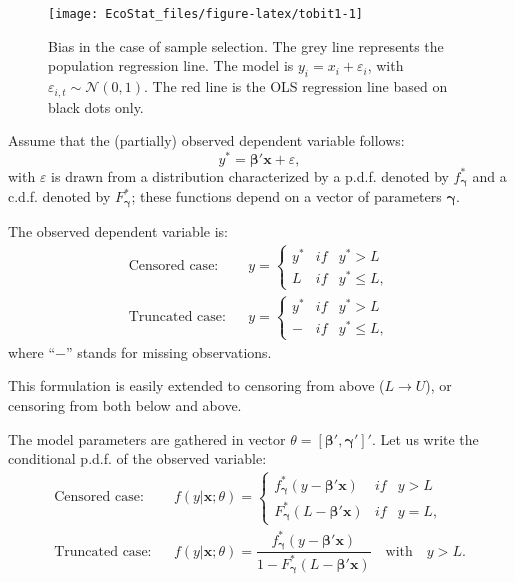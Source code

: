 \documentclass[
  12pt,
]{book}
\theoremstyle{definition}
\theoremstyle{definition}
\theoremstyle{definition}
\theoremstyle{definition}
\theoremstyle{remark}
\begin{document}
\begin{figure}
\texttt{[image: EcoStat\_files/figure-latex/tobit1-1]} \caption{Bias in the case of sample selection. The grey line represents the population regression line. The model is $y_i = x_i + \varepsilon_i$, with $\varepsilon_{i,t} \sim \mathcal{N}(0,1)$. The red line is the OLS regression line based on black dots only.}\label{fig:tobit1}
\end{figure}

Assume that the (partially) observed dependent variable follows:
\[
y^* = \boldsymbol\beta'\mathbf{x} + \varepsilon,
\]
with \(\varepsilon\) is drawn from a distribution characterized by a p.d.f. denoted by \(f_{\boldsymbol\gamma}^*\) and a c.d.f. denoted by \(F_{\boldsymbol\gamma}^*\); these functions depend on a vector of parameters \(\boldsymbol{\gamma}\).

The observed dependent variable is:
\begin{eqnarray*}
\mbox{Censored case:}&&y = \left\{
\begin{array}{ccc}
y^* &if& y^*>L \\
L &if& y^*\le L,
\end{array}
\right.\\
\mbox{Truncated case:}&&y = \left\{
\begin{array}{ccc}
y^* &if& y^*>L \\
- &if& y^*\le L,
\end{array}
\right.
\end{eqnarray*}
where ``\(-\)'' stands for missing observations.

This formulation is easily extended to censoring from above (\(L \rightarrow U\)), or censoring from both below and above.

The model parameters are gathered in vector \(\theta = [\boldsymbol\beta',\boldsymbol\gamma']'\). Let us write the conditional p.d.f. of the observed variable:
\begin{eqnarray*}
\mbox{Censored case:}&& f(y|\mathbf{x};\theta) = \left\{
\begin{array}{ccc}
f_{\boldsymbol\gamma}^*(y -  \boldsymbol\beta'\mathbf{x}) &if& y>L \\
F_{\boldsymbol\gamma}^*(L-  \boldsymbol\beta'\mathbf{x}) &if& y = L,
\end{array}
\right.\\
\mbox{Truncated case:}&&  f(y|\mathbf{x};\theta) =
\dfrac{f_{\boldsymbol\gamma}^*(y -  \boldsymbol\beta'\mathbf{x})}{1 - F_{\boldsymbol\gamma}^*(L-  \boldsymbol\beta'\mathbf{x})} \quad \mbox{with} \quad y>L.
\end{eqnarray*}
\end{document}
